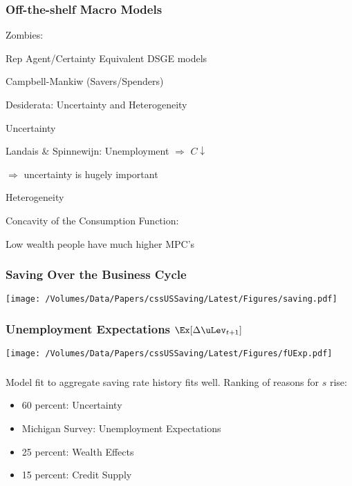 \documentclass{beamer}
\begin{document}
\begin{frame}\frametitle{Off-the-shelf Macro Models}

Zombies:
\bi
\item Rep Agent/Certainty Equivalent DSGE models
\item Campbell-Mankiw (Savers/Spenders) 
\ei

Desiderata: Uncertainty and Heterogeneity
\bi
\item Uncertainty
\bi
\item Landais \& Spinnewijn: Unemployment $\Rightarrow$ $C \downarrow$
\item $\Rightarrow$ uncertainty is hugely important
\ei
\item Heterogeneity
\bi
\item Concavity of the Consumption Function:
\bi
\item Low wealth people have much higher MPC's
\ei
\ei
\ei



\end{frame}

\begin{frame}\frametitle{Saving Over the Business Cycle}
\begin{center}
\texttt{[image: /Volumes/Data/Papers/cssUSSaving/Latest/Figures/saving.pdf]}
\end{center}
\end{frame}

\begin{frame}\frametitle{Unemployment Expectations $\Ex[\Delta \uLev_{t+1}]$}
\begin{center}
\texttt{[image: /Volumes/Data/Papers/cssUSSaving/Latest/Figures/fUExp.pdf]}
\end{center}
\end{frame}


\begin{frame}\frametitle{\cite{cssUSSaving}}

Model fit to aggregate saving rate history fits well.  Ranking of reasons for $s$ rise: \pause
\begin{itemize}
\item 60 percent: Uncertainty 
\bi
\item Michigan Survey: Unemployment Expectations
\ei
\item 25 percent: Wealth Effects
\item 15 percent: Credit Supply
\end{itemize}

\end{frame}
\end{document}
